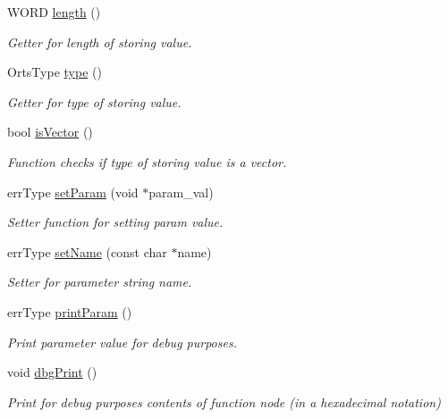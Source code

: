 \begin{DoxyCompactItemize}
WORD \hyperlink{classparam__desc_ac08a055b01d9d819a9a975dc6fe79d6f}{length} ()
\begin{DoxyCompactList}\small\item\em Getter for length of storing value. \item\end{DoxyCompactList}\item 
OrtsType \hyperlink{classparam__desc_af1e835d415323653f36f772fa19ebe98}{type} ()
\begin{DoxyCompactList}\small\item\em Getter for type of storing value. \item\end{DoxyCompactList}\item 
bool \hyperlink{classparam__desc_a4c85c9ba1a0a56807107d9442c5ce789}{isVector} ()
\begin{DoxyCompactList}\small\item\em Function checks if type of storing value is a vector. \item\end{DoxyCompactList}\item 
errType \hyperlink{classparam__desc_a5b46389be506db92ac175bd71255fa7f}{setParam} (void $\ast$param\_\-val)
\begin{DoxyCompactList}\small\item\em Setter function for setting param value. \item\end{DoxyCompactList}\item 
errType \hyperlink{classparam__desc_a26a976df3ae6d3b6bef0f5cec4dcc6c2}{setName} (const char $\ast$name)
\begin{DoxyCompactList}\small\item\em Setter for parameter string name. \item\end{DoxyCompactList}\item 
errType \hyperlink{classparam__desc_ad0ba366e39a4c6622dcd24af221bf351}{printParam} ()
\begin{DoxyCompactList}\small\item\em Print parameter value for debug purposes. \item\end{DoxyCompactList}\item 
void \hyperlink{classparam__desc_aaf796d893835efe1107d3735c7b56554}{dbgPrint} ()
\begin{DoxyCompactList}\small\item\em Print for debug purposes contents of function node (in a hexadecimal notation) \item\end{DoxyCompactList}\end{DoxyCompactItemize}
